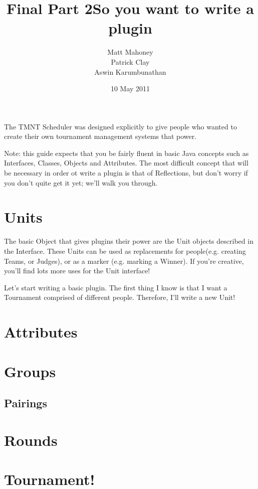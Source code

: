 \documentclass[11pt]{article}
\title{Final Part 2}
\author{Matt Mahoney \\
	Patrick Clay \\
	Aswin Karumbunathan}
\date{10 May 2011}
\begin{document}
\maketitle

\title{So you want to write a plugin}

The TMNT Scheduler was designed explicitly to give people who wanted to create their own tournament management
systems that power.

Note: this guide expects that you be fairly fluent in basic Java concepts such as Interfaces, Classes, Objects
and Attributes. The most difficult concept that will be necessary in order ot write a plugin is that of Reflections,
but don't worry if you don't quite get it yet; we'll walk you through.

\section{Units}

The basic Object that gives plugins their power are the Unit objects described in the Interface. These Units
can be used as replacements for people(e.g. creating Teams, or Judges), or as a marker (e.g. marking a Winner).
If you're creative, you'll find lots more uses for the Unit interface!

Let's start writing a basic plugin. The first thing I know is that I want a Tournament comprised of different people.
Therefore, I'll write a new Unit!

\lstset{language=Java}

\section{Attributes}

\section{Groups}

\subsection{Pairings}

\section{Rounds}

\section{Tournament!}
\end{document}
